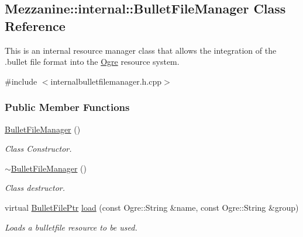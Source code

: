 \hypertarget{classMezzanine_1_1internal_1_1BulletFileManager}{
\subsection{Mezzanine::internal::BulletFileManager Class Reference}
\label{classMezzanine_1_1internal_1_1BulletFileManager}
}


This is an internal resource manager class that allows the integration of the .bullet file format into the \hyperlink{namespaceOgre}{Ogre} resource system.  




{\ttfamily \#include $<$internalbulletfilemanager.h.cpp$>$}

\subsubsection*{Public Member Functions}
\begin{DoxyCompactItemize}
\item 
\hypertarget{classMezzanine_1_1internal_1_1BulletFileManager_a6025009b2daecdfff41cace8b3f51766}{
\hyperlink{classMezzanine_1_1internal_1_1BulletFileManager_a6025009b2daecdfff41cace8b3f51766}{BulletFileManager} ()}
\label{classMezzanine_1_1internal_1_1BulletFileManager_a6025009b2daecdfff41cace8b3f51766}

\begin{DoxyCompactList}\small\item\em Class Constructor. \item\end{DoxyCompactList}\item 
\hypertarget{classMezzanine_1_1internal_1_1BulletFileManager_aa901ebc42ced1c9d6900cb77699e8da9}{
\hyperlink{classMezzanine_1_1internal_1_1BulletFileManager_aa901ebc42ced1c9d6900cb77699e8da9}{$\sim$BulletFileManager} ()}
\label{classMezzanine_1_1internal_1_1BulletFileManager_aa901ebc42ced1c9d6900cb77699e8da9}

\begin{DoxyCompactList}\small\item\em Class destructor. \item\end{DoxyCompactList}\item 
virtual \hyperlink{classMezzanine_1_1internal_1_1BulletFilePtr}{BulletFilePtr} \hyperlink{classMezzanine_1_1internal_1_1BulletFileManager_ae405dda559b6d5ec18ddf2838c8888ac}{load} (const Ogre::String \&name, const Ogre::String \&group)
\begin{DoxyCompactList}\small\item\em Loads a bulletfile resource to be used. \item\end{DoxyCompactList}\end{DoxyCompactItemize}
